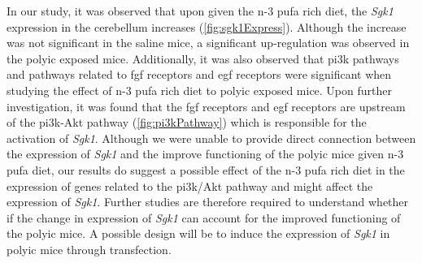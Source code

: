 In our study, it was observed that upon given the n-3 \gls{pufa} rich diet, the \textit{Sgk1} expression in the cerebellum increases (\cref{fig:sgk1Express}).
Although the increase was not significant in the saline mice, a significant up-regulation was observed in the \gls{polyic} exposed mice. 
Additionally, it was also observed that \gls{pi3k} pathways and pathways related to \gls{fgf} receptors and \gls{egf} receptors were significant when studying the effect of n-3 \gls{pufa} rich diet to \gls{polyic} exposed mice.
Upon further investigation, it was found that the \gls{fgf} receptors and \gls{egf} receptors are upstream of the \gls{pi3k}-Akt pathway (\cref{fig:pi3kPathway}) which is responsible for the activation of \textit{Sgk1}.
Although we were unable to provide direct connection between the expression of \textit{Sgk1} and the improve functioning of the \gls{polyic} mice given n-3 \gls{pufa} diet, our results do suggest a possible effect of the n-3 \gls{pufa} rich diet in the expression of genes related to the \gls{pi3k}/Akt pathway and might affect the expression of \textit{Sgk1}.
Further studies are therefore required to understand whether if the change in expression of \textit{Sgk1} can account for the improved functioning of the \gls{polyic} mice. 
A possible design will be to induce the expression of \textit{Sgk1} in \gls{polyic} mice through transfection.

